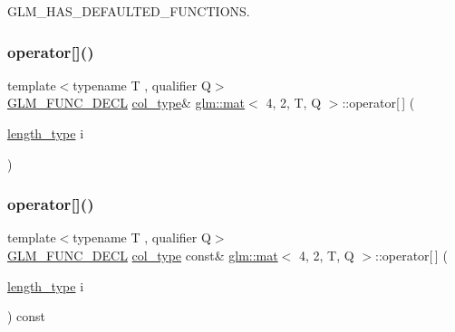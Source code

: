 G\+L\+M\+\_\+\+H\+A\+S\+\_\+\+D\+E\+F\+A\+U\+L\+T\+E\+D\+\_\+\+F\+U\+N\+C\+T\+I\+O\+NS. 

\mbox{\label{structglm_1_1mat_3_014_00_012_00_01_t_00_01_q_01_4_ac3817abff98f5328dd58c18536a6a368}} 
\subsubsection{\texorpdfstring{operator[]()}{operator[]()}\hspace{0.1cm}{\footnotesize\ttfamily [1/2]}}
{\footnotesize\ttfamily template$<$typename T , qualifier Q$>$ \\
\mbox{\hyperlink{setup_8hpp_ab2d052de21a70539923e9bcbf6e83a51}{G\+L\+M\+\_\+\+F\+U\+N\+C\+\_\+\+D\+E\+CL}} \mbox{\hyperlink{structglm_1_1mat_3_014_00_012_00_01_t_00_01_q_01_4_a60138ab077eb3bef96e654e672af5059}{col\+\_\+type}}\& \mbox{\hyperlink{structglm_1_1mat}{glm\+::mat}}$<$ 4, 2, T, Q $>$\+::operator\mbox{[}$\,$\mbox{]} (\begin{DoxyParamCaption}\item[{\mbox{\hyperlink{structglm_1_1mat_3_014_00_012_00_01_t_00_01_q_01_4_a4b192a2630331f70ca61657d9783026e}{length\+\_\+type}}}]{i }\end{DoxyParamCaption})}

\mbox{\label{structglm_1_1mat_3_014_00_012_00_01_t_00_01_q_01_4_a93bfd9601db1127f3204daa428f627e6}} 
\subsubsection{\texorpdfstring{operator[]()}{operator[]()}\hspace{0.1cm}{\footnotesize\ttfamily [2/2]}}
{\footnotesize\ttfamily template$<$typename T , qualifier Q$>$ \\
\mbox{\hyperlink{setup_8hpp_ab2d052de21a70539923e9bcbf6e83a51}{G\+L\+M\+\_\+\+F\+U\+N\+C\+\_\+\+D\+E\+CL}} \mbox{\hyperlink{structglm_1_1mat_3_014_00_012_00_01_t_00_01_q_01_4_a60138ab077eb3bef96e654e672af5059}{col\+\_\+type}} const\& \mbox{\hyperlink{structglm_1_1mat}{glm\+::mat}}$<$ 4, 2, T, Q $>$\+::operator\mbox{[}$\,$\mbox{]} (\begin{DoxyParamCaption}\item[{\mbox{\hyperlink{structglm_1_1mat_3_014_00_012_00_01_t_00_01_q_01_4_a4b192a2630331f70ca61657d9783026e}{length\+\_\+type}}}]{i }\end{DoxyParamCaption}) const}




